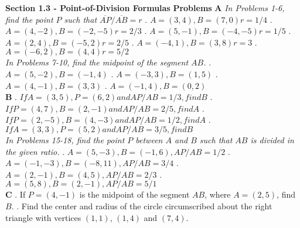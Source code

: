 \documentclass[10pt,letterpaper]{article}
\begin{document}
\textbf{Section 1.3 - Point-of-Division Formulas}
\newline \textbf{Problems}
\newline \textbf{A}
\newline \textit{In Problems 1-6, find the point $P$ such that $\overline{AP}/\overline{AB} = r$}
. $A=(3,4), B=(7,0) r=1/4$
. $A=(4,-2), B=(-2,-5) r=2/3$
. $A=(5, -1), B=(-4,-5) r=1/5$
. $A=(2,4), B=(-5,2) r=2/5$
. $A=(-4,1), B=(3,8) r=3$
. $A=(-6,2), B=(4,4) r=5/2$\\
\newline \textit{In Problems 7-10, find the midpoint of the segment $AB$.}
. $A=(5,-2), B=(-1,4)$
. $A=(-3,3), B=(1,5)$
. $A=(4,-1), B=(3,3)$
. $A=(-1,4), B=(0,2)$\\
\newline \textbf{B}
. $If A=(3,5), P=(6,2) and AP/AB=1/3, find B$
. $If P=(4,7), B=(2,-1) and AP/AB=2/5, find A$
. $If P=(2,-5), B=(4,-3) and AP/AB=1/2, find A$
. $If A=(3,3), P=(5,2) and AP/AB=3/5, find B$\\
\newline \textit{In Problems 15-18, find the point $P$ between $A$ and $B$ such that $AB$ is divided in the given ratio.}
. $A=(5,-3), B=(-1,6), AP/AB=1/2$
. $A=(-1,-3), B=(-8,11), AP/AB=3/4$
. $A=(2,-1), B=(4,5), AP/AB=2/3$
. $A=(5,8), B=(2,-1), AP/AB=5/1$\\
\newline \textbf{C}
. If $P=(4,-1)$ is the midpoint of the segment $AB$, where $A=(2,5)$, find $B$.
. Find the center and radius of the circle circumscribed about the right triangle with vertices $(1,1)$, $(1,4)$ and $(7,4)$.
\end{document}

